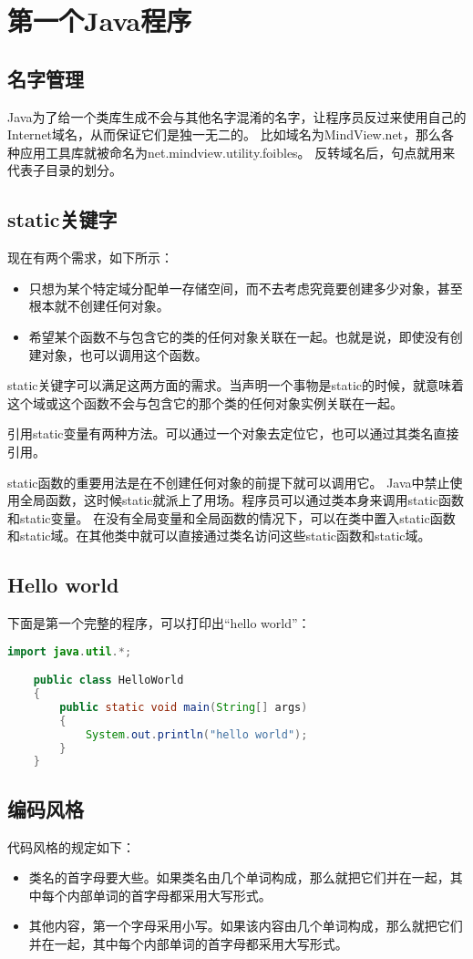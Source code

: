 \documentclass[a4paper,left=2.5cm,right=2.5cm,11pt]{article}
\begin{document}
\tableofcontents

\clearpage

\section{第一个Java程序}
\subsection{名字管理}
	Java为了给一个类库生成不会与其他名字混淆的名字，让程序员反过来使用自己的Internet域名，从而保证它们是独一无二的。
	比如域名为MindView.net，那么各种应用工具库就被命名为net.mindview.utility.foibles。
	反转域名后，句点就用来代表子目录的划分。\par
\subsection{static关键字}
	现在有两个需求，如下所示：
	\begin{itemize}
		\item 只想为某个特定域分配单一存储空间，而不去考虑究竟要创建多少对象，甚至根本就不创建任何对象。
		\item 希望某个函数不与包含它的类的任何对象关联在一起。也就是说，即使没有创建对象，也可以调用这个函数。
	\end{itemize}

	static关键字可以满足这两方面的需求。当声明一个事物是static的时候，就意味着这个域或这个函数不会与包含它的那个类的任何对象实例关联在一起。\par
	引用static变量有两种方法。可以通过一个对象去定位它，也可以通过其类名直接引用。\par
	static函数的重要用法是在不创建任何对象的前提下就可以调用它。
	Java中禁止使用全局函数，这时候static就派上了用场。程序员可以通过类本身来调用static函数和static变量。
	在没有全局变量和全局函数的情况下，可以在类中置入static函数和static域。在其他类中就可以直接通过类名访问这些static函数和static域。

\subsection{Hello world}
	下面是第一个完整的程序，可以打印出“hello world”：
	\begin{lstlisting}[language = Java]
	import java.util.*;

	public class HelloWorld
	{
		public static void main(String[] args)
		{
			System.out.println("hello world");
		}
	}
	\end{lstlisting}
\subsection{编码风格}
	代码风格的规定如下：
	\begin{itemize}
		\item 类名的首字母要大些。如果类名由几个单词构成，那么就把它们并在一起，其中每个内部单词的首字母都采用大写形式。
		\item 其他内容，第一个字母采用小写。如果该内容由几个单词构成，那么就把它们并在一起，其中每个内部单词的首字母都采用大写形式。
	\end{itemize}
\end{document}
